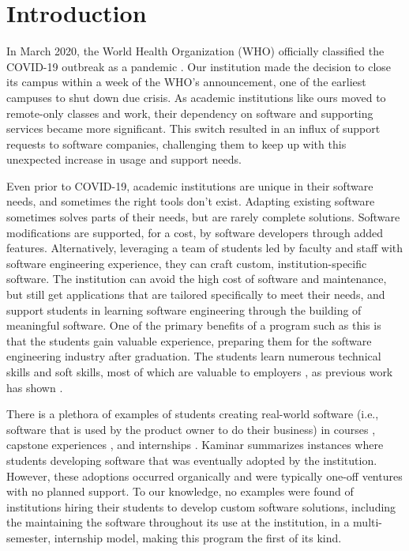 \section{Introduction}

In March 2020, the World Health Organization (WHO) officially classified the COVID-19 outbreak as a pandemic \cite{covid}. Our institution made the decision to close its campus within a week of the WHO's announcement, one of the earliest campuses to shut down due crisis. As academic institutions like ours moved to remote-only classes and work, their dependency on software and supporting services became more significant. This switch resulted in an influx of support requests to software companies, challenging them to keep up with this unexpected increase in usage and support needs.

Even prior to COVID-19, academic institutions are unique in their software needs, and sometimes the right tools don't exist. Adapting existing software sometimes solves parts of their needs, but are rarely complete solutions. Software modifications are supported, for a cost, by software developers through added features. Alternatively, leveraging a team of students led by faculty and staff with software engineering experience, they can craft custom, institution-specific software. The institution can avoid the high cost of software and maintenance, but still get applications that are tailored specifically to meet their needs, and support students in learning software engineering through the building of meaningful software. One of the primary benefits of a program such as this is that the students gain valuable experience, preparing them for the software engineering industry after graduation. The students learn numerous technical skills and soft skills, most of which are valuable to employers \cite{lavy2013soft}, as previous work has shown \cite{heggen2018hiring}.

There is a plethora of examples of students creating real-world software (i.e., software that is used by the product owner to do their business) in courses \cite{tadayon2004software}, capstone experiences \cite{capstone}, and internships \cite{rochesterfirstundergradsoftwareteam}. Kaminar \cite{kaminer_2014} summarizes instances where students developing software that was eventually adopted by the institution. However, these adoptions occurred organically and were typically one-off ventures with no planned support. To our knowledge, no examples were found of institutions hiring their students to develop custom software solutions, including the maintaining the software throughout its use at the institution, in a multi-semester, internship model, making this program the first of its kind.

